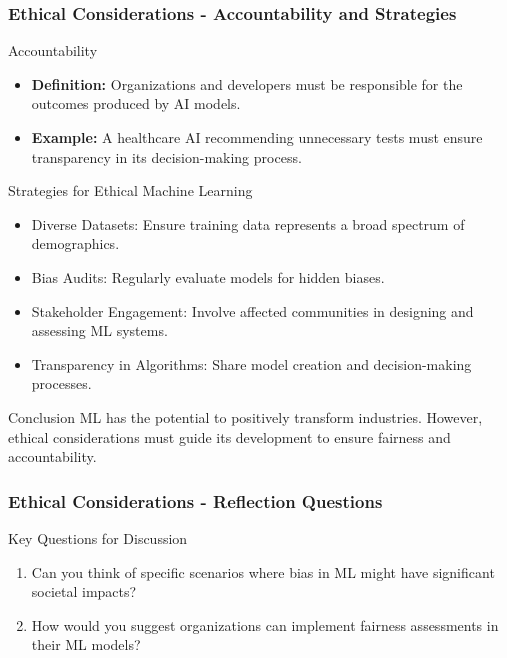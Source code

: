 \documentclass[aspectratio=169]{beamer}
\begin{document}
\begin{frame}[fragile]
    \frametitle{Ethical Considerations - Accountability and Strategies}
    \begin{block}{Accountability}
        \begin{itemize}
            \item \textbf{Definition:} Organizations and developers must be responsible for the outcomes produced by AI models.
            \item \textbf{Example:} A healthcare AI recommending unnecessary tests must ensure transparency in its decision-making process.
        \end{itemize}
    \end{block}

    \begin{block}{Strategies for Ethical Machine Learning}
        \begin{itemize}
            \item Diverse Datasets: Ensure training data represents a broad spectrum of demographics.
            \item Bias Audits: Regularly evaluate models for hidden biases.
            \item Stakeholder Engagement: Involve affected communities in designing and assessing ML systems.
            \item Transparency in Algorithms: Share model creation and decision-making processes.
        \end{itemize}
    \end{block}
    
    \begin{block}{Conclusion}
        ML has the potential to positively transform industries. However, ethical considerations must guide its development to ensure fairness and accountability.
    \end{block}
\end{frame}

\begin{frame}[fragile]
    \frametitle{Ethical Considerations - Reflection Questions}
    \begin{block}{Key Questions for Discussion}
        \begin{enumerate}
            \item Can you think of specific scenarios where bias in ML might have significant societal impacts?
            \item How would you suggest organizations can implement fairness assessments in their ML models?
        \end{enumerate}
    \end{block}
\end{frame}
\end{document}
